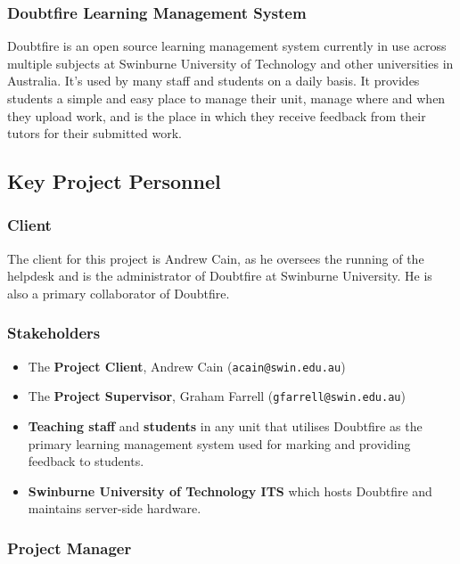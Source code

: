 \documentclass[12pt,a4paper,]{article}
\providecommand{\tightlist}{%
  \setlength{\itemsep}{0pt}\setlength{\parskip}{0pt}}
\begin{document}
\subsubsection{Doubtfire Learning Management
System}\label{doubtfire-learning-management-system}

Doubtfire is an open source learning management system currently in use
across multiple subjects at Swinburne University of Technology and other
universities in Australia. It's used by many staff and students on a
daily basis. It provides students a simple and easy place to manage
their unit, manage where and when they upload work, and is the place in
which they receive feedback from their tutors for their submitted work.

\subsection{Key Project Personnel}\label{key-project-personnel}

\subsubsection{Client}\label{client}

The client for this project is Andrew Cain, as he oversees the running
of the helpdesk and is the administrator of Doubtfire at Swinburne
University. He is also a primary collaborator of Doubtfire.

\subsubsection{Stakeholders}\label{stakeholders}

\begin{itemize}
\tightlist
\item
  The \textbf{Project Client}, Andrew Cain (\texttt{acain@swin.edu.au})
\item
  The \textbf{Project Supervisor}, Graham Farrell
  (\texttt{gfarrell@swin.edu.au})
\item
  \textbf{Teaching staff} and \textbf{students} in any unit that
  utilises Doubtfire as the primary learning management system used for
  marking and providing feedback to students.
\item
  \textbf{Swinburne University of Technology ITS} which hosts Doubtfire
  and maintains server-side hardware.
\end{itemize}

\subsubsection{Project Manager}\label{project-manager}
\end{document}
